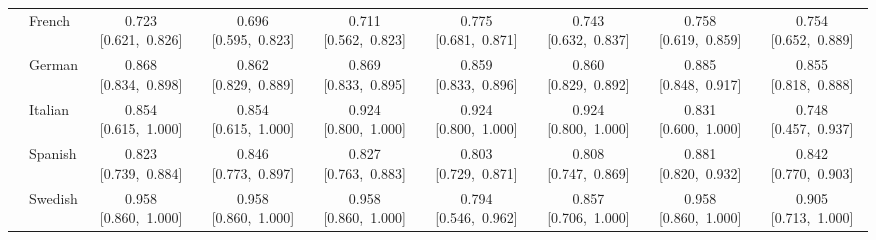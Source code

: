\begin{longtable}[t]{llccccccc}
 & French & 0.723 [0.621,~0.826] & 0.696 [0.595,~0.823] & 0.711 [0.562,~0.823] & 0.775 [0.681,~0.871] & 0.743 [0.632,~0.837] & 0.758 [0.619,~0.859] & 0.754 [0.652,~0.889]\\

 & German & 0.868 [0.834,~0.898] & 0.862 [0.829,~0.889] & 0.869 [0.833,~0.895] & 0.859 [0.833,~0.896] & 0.860 [0.829,~0.892] & 0.885 [0.848,~0.917] & 0.855 [0.818,~0.888]\\

 & Italian & 0.854 [0.615,~1.000] & 0.854 [0.615,~1.000] & 0.924 [0.800,~1.000] & 0.924 [0.800,~1.000] & 0.924 [0.800,~1.000] & 0.831 [0.600,~1.000] & 0.748 [0.457,~0.937]\\

 & Spanish & 0.823 [0.739,~0.884] & 0.846 [0.773,~0.897] & 0.827 [0.763,~0.883] & 0.803 [0.729,~0.871] & 0.808 [0.747,~0.869] & 0.881 [0.820,~0.932] & 0.842 [0.770,~0.903]\\

 & Swedish & 0.958 [0.860,~1.000] & 0.958 [0.860,~1.000] & 0.958 [0.860,~1.000] & 0.794 [0.546,~0.962] & 0.857 [0.706,~1.000] & 0.958 [0.860,~1.000] & 0.905 [0.713,~1.000]\\*
\end{longtable}
\endgroup{}
\endgroup{}
